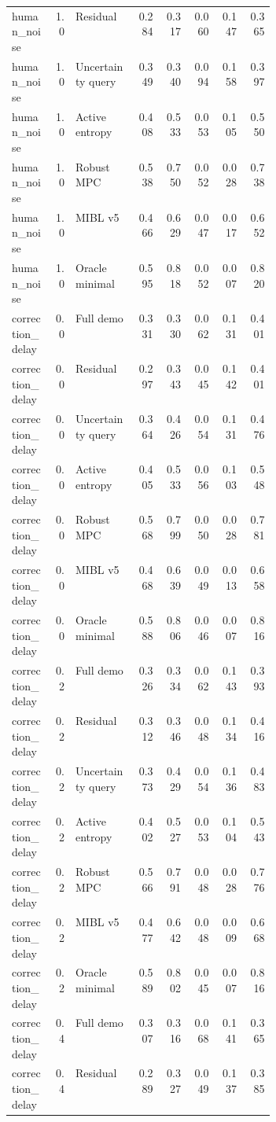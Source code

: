 \documentclass{article}
\begin{document}
\begin{center}
\begin{longtable}{p{0.16\linewidth}rp{0.23\linewidth}rrrrr}
human\_noise & 1.0 & Residual & 0.284 & 0.317 & 0.060 & 0.147 & 0.365\\
human\_noise & 1.0 & Uncertainty query & 0.349 & 0.340 & 0.094 & 0.158 & 0.397\\
human\_noise & 1.0 & Active entropy & 0.408 & 0.533 & 0.053 & 0.105 & 0.550\\
human\_noise & 1.0 & Robust MPC & 0.538 & 0.750 & 0.052 & 0.028 & 0.738\\
human\_noise & 1.0 & MIBL v5 & 0.466 & 0.629 & 0.047 & 0.017 & 0.652\\
human\_noise & 1.0 & Oracle minimal & 0.595 & 0.818 & 0.052 & 0.007 & 0.820\\
correction\_delay & 0.0 & Full demo & 0.331 & 0.330 & 0.062 & 0.131 & 0.401\\
correction\_delay & 0.0 & Residual & 0.297 & 0.343 & 0.045 & 0.142 & 0.401\\
correction\_delay & 0.0 & Uncertainty query & 0.364 & 0.426 & 0.054 & 0.131 & 0.476\\
correction\_delay & 0.0 & Active entropy & 0.405 & 0.533 & 0.056 & 0.103 & 0.548\\
correction\_delay & 0.0 & Robust MPC & 0.568 & 0.799 & 0.050 & 0.028 & 0.781\\
correction\_delay & 0.0 & MIBL v5 & 0.468 & 0.639 & 0.049 & 0.013 & 0.658\\
correction\_delay & 0.0 & Oracle minimal & 0.588 & 0.806 & 0.046 & 0.007 & 0.816\\
correction\_delay & 0.2 & Full demo & 0.326 & 0.334 & 0.062 & 0.143 & 0.393\\
correction\_delay & 0.2 & Residual & 0.312 & 0.346 & 0.048 & 0.134 & 0.416\\
correction\_delay & 0.2 & Uncertainty query & 0.373 & 0.429 & 0.054 & 0.136 & 0.483\\
correction\_delay & 0.2 & Active entropy & 0.402 & 0.527 & 0.053 & 0.104 & 0.543\\
correction\_delay & 0.2 & Robust MPC & 0.566 & 0.791 & 0.048 & 0.028 & 0.776\\
correction\_delay & 0.2 & MIBL v5 & 0.477 & 0.642 & 0.048 & 0.009 & 0.668\\
correction\_delay & 0.2 & Oracle minimal & 0.589 & 0.802 & 0.045 & 0.007 & 0.816\\
correction\_delay & 0.4 & Full demo & 0.307 & 0.316 & 0.068 & 0.141 & 0.365\\
correction\_delay & 0.4 & Residual & 0.289 & 0.327 & 0.049 & 0.137 & 0.385\\

\end{longtable}
\end{center}
\end{document}

